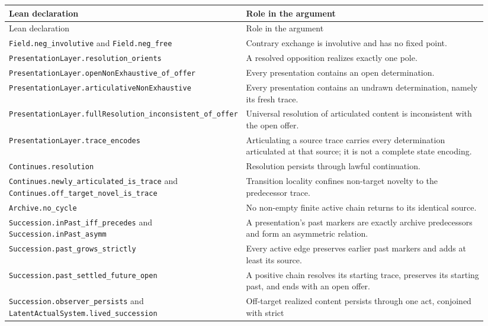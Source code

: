\documentclass[11pt]{article}
\theoremstyle{definition}
\theoremstyle{remark}
\newcommand{\lean}[1]{\nolinkurl{#1}}
\begin{document}
\small
\begin{longtable}{@{}>{\raggedright\arraybackslash}p{0.33\linewidth}
  >{\raggedright\arraybackslash}p{0.61\linewidth}@{}}
\toprule
Lean declaration & Role in the argument \\
\midrule
\endfirsthead
\toprule
Lean declaration & Role in the argument \\
\midrule
\endhead
\lean{Field.neg_involutive} and \lean{Field.neg_free}
  & Contrary exchange is involutive and has no fixed point. \\
\lean{PresentationLayer.resolution_orients}
  & A resolved opposition realizes exactly one pole. \\
\lean{PresentationLayer.openNonExhaustive_of_offer}
  & Every presentation contains an open determination. \\
\lean{PresentationLayer.articulativeNonExhaustive}
  & Every presentation contains an undrawn determination, namely its fresh
    trace. \\
\lean{PresentationLayer.fullResolution_inconsistent_of_offer}
  & Universal resolution of articulated content is inconsistent with the open
    offer. \\
\lean{PresentationLayer.trace_encodes}
  & Articulating a source trace carries every determination articulated at that
    source; it is not a complete state encoding. \\
\lean{Continues.resolution}
  & Resolution persists through lawful continuation. \\
\lean{Continues.newly_articulated_is_trace} and
\lean{Continues.off_target_novel_is_trace}
  & Transition locality confines non-target novelty to the predecessor trace. \\
\lean{Archive.no_cycle}
  & No non-empty finite active chain returns to its identical source. \\
\lean{Succession.inPast_iff_precedes} and
\lean{Succession.inPast_asymm}
  & A presentation's past markers are exactly archive predecessors and form an
    asymmetric relation. \\
\lean{Succession.past_grows_strictly}
  & Every active edge preserves earlier past markers and adds at least its
    source. \\
\lean{Succession.past_settled_future_open}
  & A positive chain resolves its starting trace, preserves its starting past,
    and ends with an open offer. \\
\lean{Succession.observer_persists} and
\lean{LatentActualSystem.lived_succession}
  & Off-target realized content persists through one act, conjoined with strict

\end{longtable}
\end{document}
